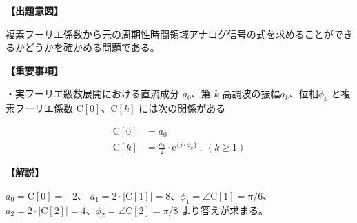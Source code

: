 \noindent \textbf{【出題意図】}

\bigskip
\noindent 複素フーリエ係数から元の周期性時間領域アナログ信号の式を求めることができるかどうかを確かめる問題である。

\vspace{1em}
\noindent \textbf{【重要事項】}

\medskip
\noindent・実フーリエ級数展開における直流成分 $a_0$、第 $k$ 高調波の振幅$a_k$、位相$\phi_k$ と複素フーリエ係数 $\textrm{C}[0]$、$\textrm{C}[k]$ には次の関係がある

\begin{align*}
\textrm{C}[0] &= a_0 \\
\textrm{C}[k] &= \frac{a_k}{2} \cdot \textrm{e}^{\{j \cdot \phi_k \}} \ ,\ (k\geq 1)
\end{align*}


\bigskip

\vspace{1em}
\noindent \textbf{【解説】}

\bigskip
\noindent 
$a_0 = \textrm{C}[0] = -2$、
$a_1 = 2\cdot |\textrm{C}[1]| = 8$、$\phi_1 = \angle\textrm{C}[1] = \pi/6$、
$a_2 = 2\cdot |\textrm{C}[2]| = 4$、$\phi_2 = \angle\textrm{C}[2] = \pi/8$
より答えが求まる。
